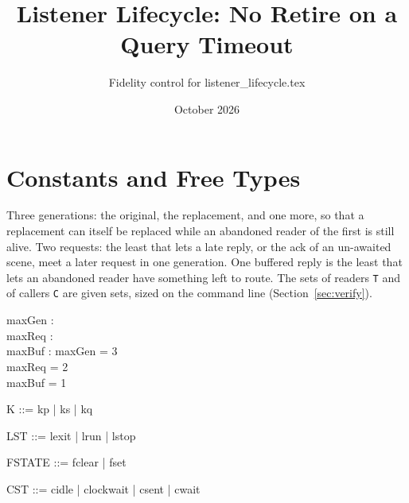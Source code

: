 \documentclass[a4paper,10pt,fleqn]{article}
\begin{document}
\title{Listener Lifecycle: No Retire on a Query Timeout}
\author{Fidelity control for listener\_lifecycle.tex}
\date{October 2026}
\maketitle

\section{Constants and Free Types}

Three generations: the original, the replacement, and one more, so that a
replacement can itself be replaced while an abandoned reader of the first is
still alive.  Two requests: the least that lets a late reply, or the ack of an
un-awaited scene, meet a later request in one generation.  One buffered reply
is the least that lets an abandoned reader have something left to route.  The
sets of readers \texttt{T} and of callers \texttt{C} are given sets, sized on
the command line (Section~\ref{sec:verify}).

\begin{axdef}
  maxGen : \nat \\
  maxReq : \nat \\
  maxBuf : \nat
\where
  maxGen = 3 \\
  maxReq = 2 \\
  maxBuf = 1
\end{axdef}

\begin{zed}
  [T]
\end{zed}

\begin{zed}
  [C]
\end{zed}

\begin{zed}
  K ::= kp | ks | kq
\end{zed}

\begin{zed}
  LST ::= lexit | lrun | lstop
\end{zed}

\begin{zed}
  FSTATE ::= fclear | fset
\end{zed}

\begin{zed}
  CST ::= cidle | clockwait | csent | cwait
\end{zed}

\end{document}
